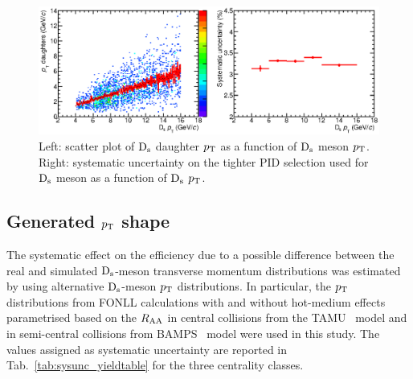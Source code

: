 \begin{figure}[!h]
 \centering
 \includegraphics[angle=0, width=13cm]{./FigCap5/PIDsystDs_MCall.eps}
 \caption{Left: scatter plot of ${\rm D_s}$ daughter $p_{\rm T}$ as a function of ${\rm D_s}$ meson $p_{\rm T}$. Right: systematic uncertainty on the tighter PID selection used for ${\rm D_s}$ meson as a function of ${\rm D_s}$ $p_{\rm T}$.}
 \label{fig:DsPIDsys} 
\end{figure}

\subsection{Generated $p_{\rm T}$ shape}
\label{sec:MCptshapeAA}
The systematic effect on the efficiency due to a possible difference between 
the real and simulated ${\rm D_s}$-meson transverse momentum distributions
was estimated by using alternative ${\rm D_s}$-meson $p_{\rm T}$ distributions.
In particular, the $p_{\rm T}$ distributions from FONLL calculations with
and without hot-medium effects parametrised based on the $R_{\rm AA}$ in central collisions from the 
TAMU~\cite{He:2014cla} model and in semi-central collisions from 
BAMPS~\cite{Uphoff:2014hza} model were used in this study.
The values assigned as systematic uncertainty are reported in 
Tab.~\ref{tab:sysunc_yieldtable} for the three centrality classes.


